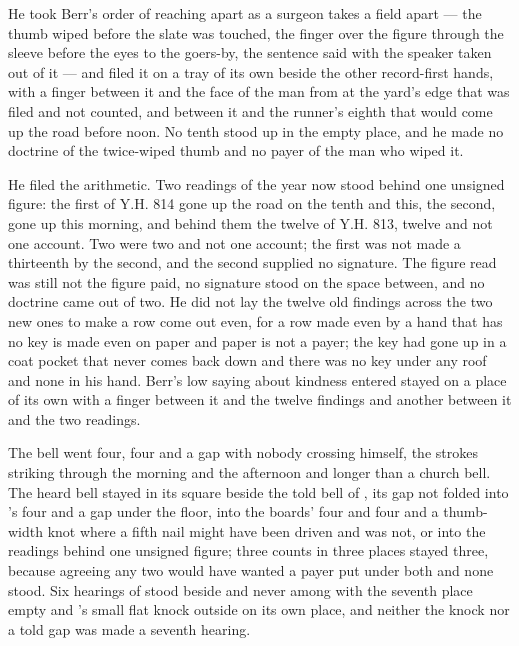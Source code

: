 He took Berr's order of reaching apart as a surgeon takes a field apart --- the thumb wiped before the slate was touched, the finger over the figure through the sleeve before the eyes to the goers-by, the sentence said with the speaker taken out of it --- and filed it on a tray of its own beside the other record-first hands, with a finger between it and the face of the man from  at the yard's edge that was filed and not counted, and between it and the runner's eighth that would come up the road before noon. No tenth stood up in the empty place, and he made no doctrine of the twice-wiped thumb and no payer of the man who wiped it.

He filed the arithmetic. Two readings of the year now stood behind one unsigned figure: the first of Y.H. 814 gone up the road on the tenth and this, the second, gone up this morning, and behind them the twelve of Y.H. 813, twelve and not one account. Two were two and not one account; the first was not made a thirteenth by the second, and the second supplied no signature. The figure read was still not the figure paid, no signature stood on the space between, and no doctrine came out of two. He did not lay the twelve old findings across the two new ones to make a row come out even, for a row made even by a hand that has no key is made even on paper and paper is not a payer; the key had gone up in a coat pocket that never comes back down and there was no key under any roof and none in his hand. Berr's low saying about kindness entered stayed on a place of its own with a finger between it and the twelve findings and another between it and the two readings.

The bell went four, four and a gap with nobody crossing himself, the strokes striking through the morning and the afternoon and longer than a church bell. The heard bell stayed in its square beside the told bell of , its gap not folded into 's four and a gap under the floor, into the boards' four and four and a thumb-width knot where a fifth nail might have been driven and was not, or into the readings behind one unsigned figure; three counts in three places stayed three, because agreeing any two would have wanted a payer put under both and none stood. Six hearings of  stood beside and never among with the seventh place empty and 's small flat knock outside on its own place, and neither the knock nor a told gap was made a seventh hearing.

